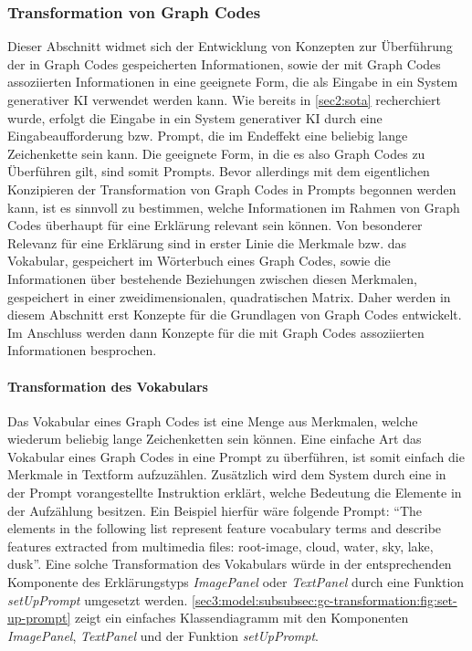 \subsubsection{Transformation von Graph Codes}
\label{sec3:model:subsubsec:gc-transformation}
Dieser Abschnitt widmet sich der Entwicklung von Konzepten zur Überführung der in Graph Codes gespeicherten Informationen, sowie der mit Graph Codes assoziierten Informationen in eine geeignete Form, die als Eingabe in ein System generativer KI verwendet werden kann.
Wie bereits in \cref{sec2:sota} recherchiert wurde, erfolgt die Eingabe in ein System generativer KI durch eine Eingabeaufforderung bzw. Prompt, die im Endeffekt eine beliebig lange Zeichenkette sein kann.
Die geeignete Form, in die es also Graph Codes zu Überführen gilt, sind somit Prompts.
Bevor allerdings mit dem eigentlichen Konzipieren der Transformation von Graph Codes in Prompts begonnen werden kann, ist es sinnvoll zu bestimmen, welche Informationen im Rahmen von Graph Codes überhaupt für eine Erklärung relevant sein können.
Von besonderer Relevanz für eine Erklärung sind in erster Linie die Merkmale bzw. das Vokabular, gespeichert im Wörterbuch eines Graph Codes, sowie die Informationen über bestehende Beziehungen zwischen diesen Merkmalen, gespeichert in einer zweidimensionalen, quadratischen Matrix.
Daher werden in diesem Abschnitt erst Konzepte für die Grundlagen von Graph Codes entwickelt.
Im Anschluss werden dann Konzepte für die mit Graph Codes assoziierten Informationen besprochen.

\paragraph{Transformation des Vokabulars}
Das Vokabular eines Graph Codes ist eine Menge aus Merkmalen, welche wiederum beliebig lange Zeichenketten sein können.
Eine einfache Art das Vokabular eines Graph Codes in eine Prompt zu überführen, ist somit einfach die Merkmale in Textform aufzuzählen.
Zusätzlich wird dem System durch eine in der Prompt vorangestellte Instruktion erklärt, welche Bedeutung die Elemente in der Aufzählung besitzen.
Ein Beispiel hierfür wäre folgende Prompt: \enquote{The elements in the following list represent feature vocabulary terms and describe features extracted from multimedia files: root-image, cloud, water, sky, lake, dusk}.
Eine solche Transformation des Vokabulars würde in der entsprechenden Komponente des Erklärungstyps \textit{ImagePanel} oder \textit{TextPanel} durch eine Funktion \textit{setUpPrompt} umgesetzt werden.
\cref{sec3:model:subsubsec:gc-transformation:fig:set-up-prompt} zeigt ein einfaches Klassendiagramm mit den Komponenten \textit{ImagePanel}, \textit{TextPanel} und der Funktion \textit{setUpPrompt}.

